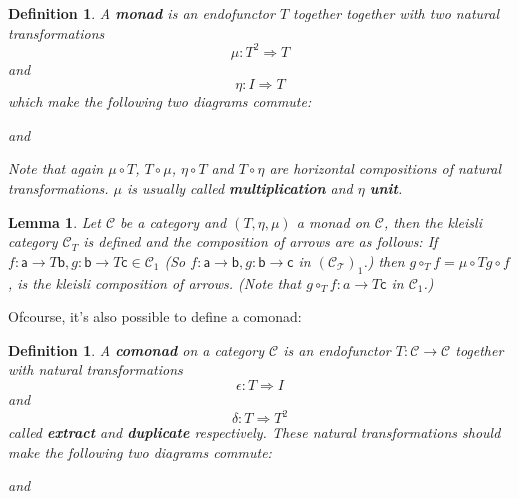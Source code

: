 \documentclass{article}
\newcommand{\cat}[1]{\mathcal{#1}} %
\newcommand{\catm}[1]{\cat{#1}_1} %
\newcommand{\ob}[1]{\mathsf{#1}} %
\newtheorem{lemma}[theorem]{Lemma}
\newtheorem{definition}[theorem]{Definition}
\begin{document}
\begin{definition}
	A \textbf{monad} is an endofunctor $T$ together together with two natural transformations
	$$ \mu: T^2 \Rightarrow T $$
	and
	$$ \eta: I \Rightarrow T $$
	which make the following two diagrams commute:

	and
	Note that again $\mu \circ T$, $T \circ \mu$, $\eta \circ T$ and $T \circ \eta$ are horizontal compositions of natural transformations.
	$\mu$ is usually called \textbf{multiplication} and $\eta$ \textbf{unit}.
\end{definition}

\begin{lemma}
	Let $\cat{C}$ be a category and $(T, \eta, \mu)$ a monad on $\cat{C}$, then the kleisli category $\cat{C}_T$ is defined and the composition of arrows are as follows:
	If $f: \ob{a} \rightarrow T\ob{b}, g: \ob{b} \rightarrow T\ob{c} \in \catm{C}$ (So $f: \ob{a} \rightarrow \ob{b}, g: \ob{b} \rightarrow \ob{c}$ in $(\cat{C_T})_1$.)
	then $g \circ_T f = \mu \circ Tg \circ f$, is the kleisli composition of arrows. (Note that $g \circ_T f: a \rightarrow T\ob{c}$ in $\catm{C}$.)
\end{lemma}

Ofcourse, it's also possible to define a comonad:

\begin{definition}
	A \textbf{comonad} on a category $\cat{C}$ is an endofunctor $T: \cat{C} \rightarrow \cat{C}$ together with natural transformations
	$$ \epsilon: T \Rightarrow I $$
	and
	$$ \delta: T \Rightarrow T^2 $$
	called \textbf{extract} and \textbf{duplicate} respectively.
	These natural transformations should make the following two diagrams commute:

	and
\end{definition}
\end{document}
